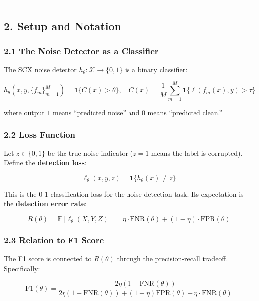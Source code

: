 \documentclass[
  12pt,
]{ctexart}
\begin{document}
\begin{center}\rule{0.5\linewidth}{0.5pt}\end{center}

\subsection{2. Setup and Notation}\label{setup-and-notation}

\subsubsection{2.1 The Noise Detector as a
Classifier}\label{the-noise-detector-as-a-classifier}

The SCX noise detector \(h_\theta: \mathcal{X} \to \{0,1\}\) is a binary
classifier:

\[h_\theta(x, y, \{f_m\}_{m=1}^M) = \mathbf{1}\{C(x) > \theta\}, \quad
C(x) = \frac{1}{M} \sum_{m=1}^M \mathbf{1}\{\ell(f_m(x), y) > \tau\}\]

where output \(1\) means ``predicted noise'' and \(0\) means ``predicted
clean.''

\subsubsection{2.2 Loss Function}\label{loss-function}

Let \(z \in \{0,1\}\) be the true noise indicator (\(z = 1\) means the
label is corrupted). Define the \textbf{detection loss}:

\[\ell_\theta(x, y, z) = \mathbf{1}\{h_\theta(x) \neq z\}\]

This is the 0-1 classification loss for the noise detection task. Its
expectation is the \textbf{detection error rate}:

\[R(\theta) = \mathbb{E}[\ell_\theta(X, Y, Z)] = \eta \cdot \text{FNR}(\theta) + (1-\eta) \cdot \text{FPR}(\theta)\]

\subsubsection{2.3 Relation to F1 Score}\label{relation-to-f1-score}

The F1 score is connected to \(R(\theta)\) through the precision-recall
tradeoff. Specifically:

\[\text{F1}(\theta) = \frac{2\eta(1 - \text{FNR}(\theta))}{2\eta(1 - \text{FNR}(\theta)) + (1-\eta)\text{FPR}(\theta) + \eta \cdot \text{FNR}(\theta)}\]
\end{document}
